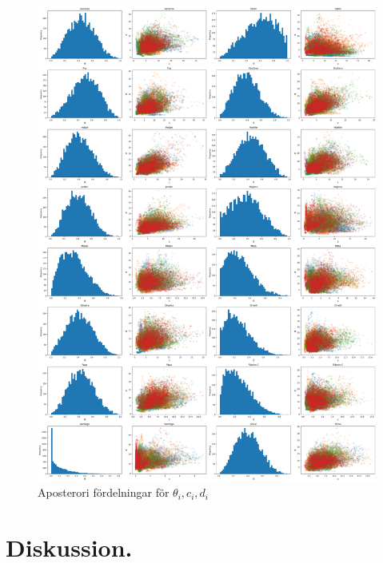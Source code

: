 \documentclass{article}
\begin{document}
\begin{figure}
    \centering
    \includegraphics[width=1\textwidth]{Figures/4b.png}
    \caption{Aposterori fördelningar för $\theta_i, c_i, d_i$}
    \label{fig:4b}
\end{figure}

\newpage
\section{Diskussion.}
\end{document}
